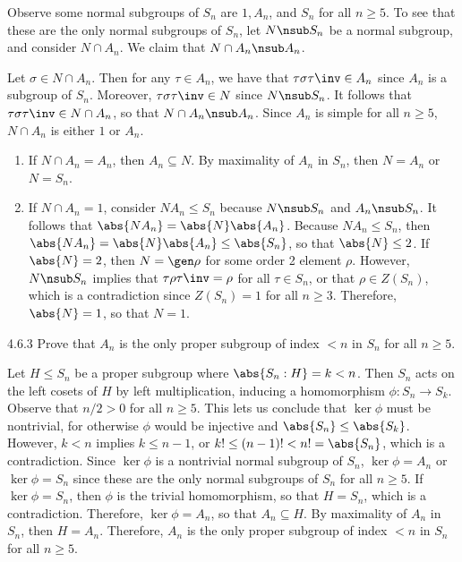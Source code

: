 \begin{sol}
	Observe some normal subgroups of $S_n$ are $1, A_n$, and $S_n$ for all $n \geq 5$.
	To see that these are the only normal subgroups of $S_n$, let $N \nsub S_n$ be a normal subgroup, and consider $N \cap A_n$.
	We claim that $N \cap A_n \nsub A_n$.

	Let $\sigma \in N \cap A_n$.
	Then for any $\tau \in A_n$, we have that $\tau \sigma \tau\inv \in A_n$ since $A_n$ is a subgroup of $S_n$.
	Moreover, $\tau \sigma \tau\inv \in N$ since $N \nsub S_n$.
	It follows that $\tau \sigma \tau\inv \in N \cap A_n$, so that $N \cap A_n \nsub A_n$.
	Since $A_n$ is simple for all $n \geq 5$, $N \cap A_n$ is either $1$ or $A_n$.
	\begin{enumerate}
		\item If $N \cap A_n = A_n$, then $A_n \subseteq N$.
	By maximality of $A_n$ in $S_n$, then $N = A_n$ or $N = S_n$.
		\item If $N \cap A_n = 1$, consider $NA_n \leq S_n$ because $N \nsub S_n$ and $A_n \nsub S_n$.
	It follows that $\abs{NA_n} = \abs{N}\abs{A_n}$.
	Because $NA_n \leq S_n$, then $\abs{NA_n} = \abs{N}\abs{A_n} \leq \abs{S_n}$, so that $\abs{N} \leq 2$.
	If $\abs{N} = 2$, then $N = \gen\rho$ for some order 2 element $\rho$.
	However, $N \nsub S_n$ implies that $\tau\rho\tau\inv = \rho$ for all $\tau \in S_n$, or that $\rho \in Z(S_n)$, which is a contradiction since $Z(S_n) = 1$ for all $n \geq 3$.
	Therefore, $\abs{N} = 1$, so that $N = 1$. \qedhere
	\end{enumerate}
\end{sol}

\begin{exercise}{4.6.3}
	Prove that $A_n$ is the only proper subgroup of index $< n$ in $S_n$ for all $n \geq 5$.
\end{exercise}

\begin{sol}
	Let $H \leq S_n$ be a proper subgroup where $\abs{S_n : H} = k < n$.
	Then $S_n$ acts on the left cosets of $H$ by left multiplication, inducing a homomorphism $\phi \colon S_n \to S_k$.
	Observe that $n/2 > 0$ for all $n \geq 5$.
	This lets us conclude that $\ker\phi$ must be nontrivial, for otherwise $\phi$ would be injective and $\abs{S_n} \leq \abs{S_k}$.
	However, $k < n$ implies $k \leq n - 1$, or $k! \leq (n - 1)! < n! = \abs{S_n}$, which is a contradiction.
	Since $\ker\phi$ is a nontrivial normal subgroup of $S_n$, $\ker\phi = A_n$ or $\ker\phi = S_n$ since these are the only normal subgroups of $S_n$ for all $n \geq 5$.
	If $\ker\phi = S_n$, then $\phi$ is the trivial homomorphism, so that $H = S_n$, which is a contradiction.
	Therefore, $\ker\phi = A_n$, so that $A_n \subseteq H$.
	By maximality of $A_n$ in $S_n$, then $H = A_n$.
	Therefore, $A_n$ is the only proper subgroup of index $< n$ in $S_n$ for all $n \geq 5$.
\end{sol}


